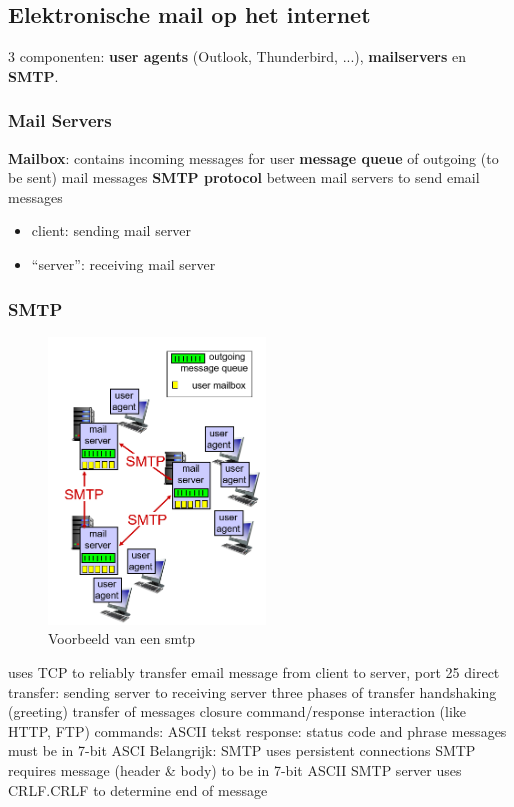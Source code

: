 \subsection{Elektronische mail op het internet}

3 componenten: \textbf{user agents} (Outlook, Thunderbird, ...), \textbf{mailservers} en \textbf{SMTP}.

\subsubsection{Mail Servers}

\textbf{Mailbox}: contains incoming messages for user
\textbf{message queue} of outgoing (to be sent) mail messages
\textbf{SMTP protocol} between mail servers to send email messages
\begin{itemize}
    \item client: sending mail server
    \item “server”: receiving mail server
\end{itemize}

\subsubsection{SMTP}

\begin{figure}[h]
\centering
\includegraphics[height=3in]{./img/imghfdst2/hdst2puntje8.png}
\caption{Voorbeeld van een smtp }
\label{fig:smtp}
\end{figure}


\bi
\itf uses TCP to reliably transfer email message from client to server, port 25
\itf direct transfer: sending server to receiving server
\itf three phases of transfer
    \bi
    \itf handshaking (greeting)
    \itf transfer of messages
    \itf closure
    \ei
\itf command/response interaction (like HTTP, FTP)
    \bi
    \itf commands: ASCII tekst
    \itf response: status code and phrase
    \ei
\itf messages must be in 7-bit ASCI
\ei
\noindent Belangrijk:
\bi
\itf SMTP uses persistent connections
\itf SMTP requires message (header \& body) to be in 7-bit ASCII
\itf SMTP server uses CRLF.CRLF to determine end of message
\ei

